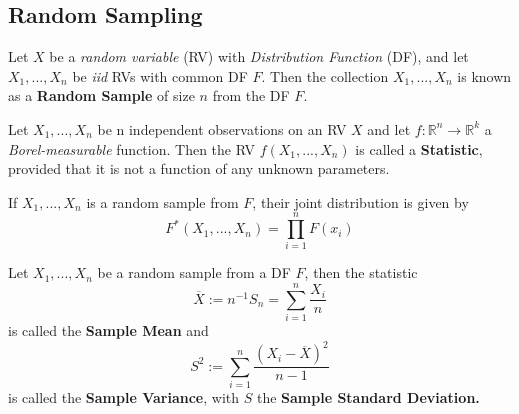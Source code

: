 \documentclass{tufte-handout}
\begin{document}
\subsection{Random Sampling}
\begin{definition}
  Let $X$ be a \textit{random variable} (RV) with \textit{Distribution Function} (DF), and let $X_1, ..., X_n$ be \textit{iid} RVs with common DF $F$.  Then the collection $X_1, ..., X_n$ is known as a \textbf{Random Sample} of size $n$ from the DF $F$.  
\end{definition}
\begin{definition}[Statistic]
  Let $X_1, ..., X_n$ be n independent observations on an RV $X$ and let $f: \mathbb{R}^n \to \mathbb{R}^k$ a \textit{Borel-measurable} function. Then the RV $f(X_1, ..., X_n)$ is called a \textbf{Statistic}, provided that it is not a function of any unknown parameters. 
\end{definition}
If $X_1,..., X_n$ is a random sample from $F$, their joint distribution is given by 
$$F^*(X_1,...,X_n) = \prod^{n}_{i=1} F(x_i) $$
\begin{definition}  Let $X_1,..., X_n$ be a random sample from a DF $F$, then the statistic 
  $$ \overline{X} := n^{-1} S_n = \sum^{n}_{i=1} \frac{X_i}{n} $$
  is called the \textbf{Sample Mean} and 
  $$S^2 := \sum^{n}_{i=1} \frac{(X_i - \overline{X} )^2}{n-1}$$ 
  is called the \textbf{Sample Variance}, with $S$ the \textbf{Sample Standard Deviation.}  

\end{definition}
\end{document}
